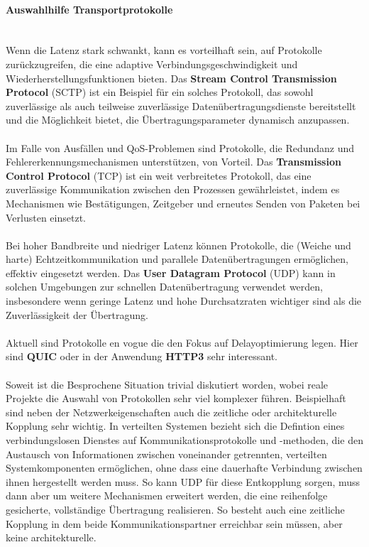 \documentclass[../vs-script-first-v01.tex]{subfiles}
\begin{document}
\paragraph{Auswahlhilfe Transportprotokolle \\\\}
Wenn die Latenz stark schwankt, kann es vorteilhaft sein, auf Protokolle zurückzugreifen, die eine adaptive Verbindungsgeschwindigkeit und Wiederherstellungsfunktionen bieten. Das \textbf{Stream Control Transmission Protocol} (SCTP) ist ein Beispiel für ein solches Protokoll, das sowohl zuverlässige als auch teilweise zuverlässige Datenübertragungsdienste bereitstellt und die Möglichkeit bietet, die Übertragungsparameter dynamisch anzupassen.
\\\\
Im Falle von Ausfällen und QoS-Problemen sind Protokolle, die Redundanz und Fehlererkennungsmechanismen unterstützen, von Vorteil. Das \textbf{Transmission Control Protocol} (TCP) ist ein weit verbreitetes Protokoll, das eine zuverlässige Kommunikation zwischen den Prozessen gewährleistet, indem es Mechanismen wie Bestätigungen, Zeitgeber und erneutes Senden von Paketen bei Verlusten einsetzt.
\\\\
Bei hoher Bandbreite und niedriger Latenz können Protokolle, die (Weiche und harte) Echtzeitkommunikation und parallele Datenübertragungen ermöglichen, effektiv eingesetzt werden. Das \textbf{User Datagram Protocol} (UDP) kann in solchen Umgebungen zur schnellen Datenübertragung verwendet werden, insbesondere wenn geringe Latenz und hohe Durchsatzraten wichtiger sind als die Zuverlässigkeit der Übertragung.
\\\\
Aktuell sind Protokolle en vogue die den Fokus auf Delayoptimierung legen. Hier sind \textbf{QUIC} oder in der Anwendung \textbf{HTTP3} sehr interessant. 
\\\\
Soweit ist die Besprochene Situation trivial diskutiert worden, wobei  reale Projekte die Auswahl von Protokollen sehr viel komplexer führen. Beispielhaft sind neben der Netzwerkeigenschaften auch die zeitliche oder architekturelle Kopplung sehr wichtig. 
In verteilten Systemen bezieht sich die Defintion eines verbindungslosen Dienstes auf Kommunikationsprotokolle und -methoden, die den Austausch von Informationen zwischen voneinander getrennten, verteilten Systemkomponenten ermöglichen, ohne dass eine dauerhafte Verbindung zwischen ihnen hergestellt werden muss. So kann UDP für diese Entkopplung sorgen, muss dann aber um weitere Mechanismen erweitert werden, die eine reihenfolge gesicherte, vollständige Übertragung realisieren. So besteht auch eine zeitliche Kopplung in dem beide Kommunikationspartner erreichbar sein müssen, aber keine architekturelle. 
\end{document}
